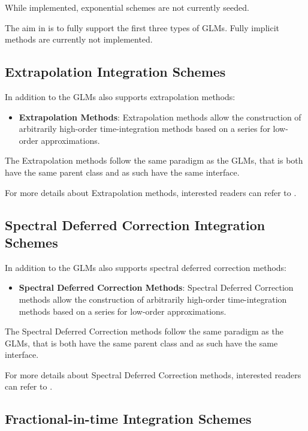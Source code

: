   While implemented, exponential schemes are not currently seeded.

The aim in {\nek} is to fully support the first three types of GLMs.
Fully implicit methods are currently not implemented.

\subsection{Extrapolation Integration Schemes}

In addition to the GLMs {\nek} also supports extrapolation methods:
\begin{itemize}
  \item \textbf{Extrapolation Methods}: Extrapolation methods allow 
    the construction of arbitrarily high-order time-integration 
    methods based on a series for low-order approximations.
\end{itemize}

The Extrapolation methods follow the same paradigm as the GLMs, that is
both have the same parent class and as such have the same interface.

For more details about Extrapolation methods, interested readers can refer
to \cite{Deuflhard1985}.

\subsection{Spectral Deferred Correction Integration Schemes}

In addition to the GLMs {\nek} also supports spectral deferred correction 
methods:
\begin{itemize}
  \item \textbf{Spectral Deferred Correction Methods}: Spectral Deferred 
    Correction methods allow the construction of arbitrarily high-order 
    time-integration methods based on a series for low-order approximations.
\end{itemize}

The Spectral Deferred Correction methods follow the same paradigm as the 
GLMs, that is both have the same parent class and as such have the same 
interface.

For more details about Spectral Deferred Correction methods, interested
readers can refer to \cite{Dutt2000, Minion2003, Ketcheson2014}.

\subsection{Fractional-in-time Integration Schemes}

